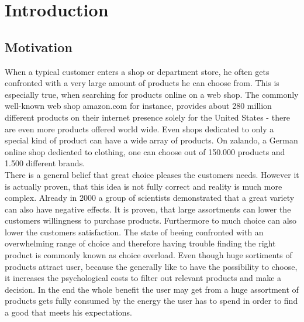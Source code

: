 
\section{Introduction}


\subsection{Motivation}
When a typical customer enters a shop or department store, he often gets confronted with a very large amount of products he can choose from.
This is especially true, when searching for products online on a web shop.
The commonly well-known web shop \gls{amazon.com} for instance, provides about 280 million different products on their internet presence solely for the United States - there are even more products offered world wide.\citep{marketplaceanalytics:2014}
Even shops dedicated to only a special kind of product can have a wide array of products.
On \gls{zalando}, a German online shop dedicated to clothing, one can choose out of 150.000 products and 1.500 different brands.\citep{visser:2014}\\

There is a general belief that great choice pleases the customers needs.
However it is actually proven, that this idea is not fully correct and reality is much more complex.
Already in 2000 a group of scientists demonstrated that a great variety can also have negative effects.
It is proven, that large assortments can lower the customers willingness to purchase products.\citep[p.~312-313]{diehl:2010}
Furthermore to much choice can also lower the customers satisfaction.\citep[320]{diehl:2010}
The state of beeing confronted with an overwhelming range of choice and therefore having trouble finding the right product is commonly known as choice overload.\citep[p.~454]{stanton:2012}
Even though huge sortiments of products attract user, because the generally like to have the possibility to choose, it increases the psychological costs to filter out relevant products and make a decision.
In the end the whole benefit the user may get from a huge assortment of products gets fully consumed by the energy the user has to spend in order to find a good that meets his expectations.
\citep[p.~64]{bollen:2010}

